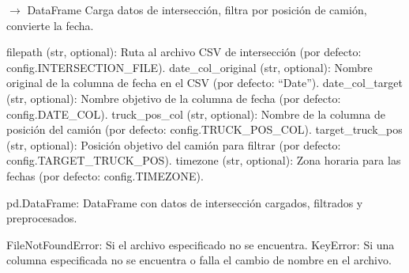 \documentclass[letterpaper,10pt,english]{sphinxmanual}
\begin{document}
\begin{fulllineitems}
\label{\detokenize{pampaneira_imputation:pampaneira_imputation.data_loader.load_intersection_data}}
\pysigstartsignatures
\pysiglinewithargsret
{}
{\sphinxparamcomma {}\sphinxparamcomma {}\sphinxparamcomma {}\sphinxparamcomma {}\sphinxparamcomma {}}
{{ $\rightarrow$ DataFrame}}
\pysigstopsignatures
\sphinxAtStartPar
Carga datos de intersección, filtra por posición de camión, convierte la fecha.
\begin{description}
\sphinxAtStartPar
filepath (str, optional): Ruta al archivo CSV de intersección (por defecto: config.INTERSECTION\_FILE).
date\_col\_original (str, optional): Nombre original de la columna de fecha en el CSV (por defecto: “Date”).
date\_col\_target (str, optional): Nombre objetivo de la columna de fecha (por defecto: config.DATE\_COL).
truck\_pos\_col (str, optional): Nombre de la columna de posición del camión (por defecto: config.TRUCK\_POS\_COL).
target\_truck\_pos (str, optional): Posición objetivo del camión para filtrar (por defecto: config.TARGET\_TRUCK\_POS).
timezone (str, optional): Zona horaria para las fechas (por defecto: config.TIMEZONE).

\sphinxAtStartPar
pd.DataFrame: DataFrame con datos de intersección cargados, filtrados y preprocesados.

\sphinxAtStartPar
FileNotFoundError: Si el archivo especificado no se encuentra.
KeyError: Si una columna especificada no se encuentra o falla el cambio de nombre en el archivo.

\end{description}

\end{fulllineitems}
\end{document}
